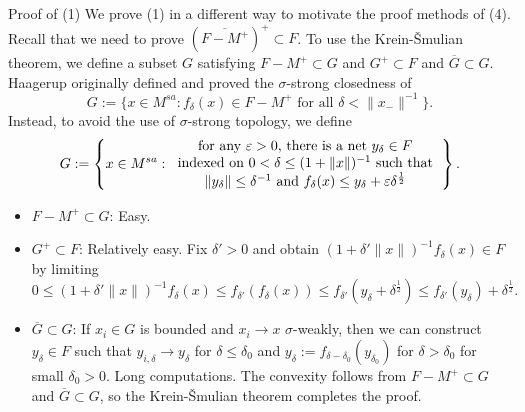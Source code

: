 \documentclass{../../../slide}
\begin{document}
\begin{frame}{Proof of (1)}
We prove (1) in a different way to motivate the proof methods of (4).
Recall that we need to prove $(\overline{F-M^+})^+\subset F$.
To use the Krein-\v Smulian theorem, we define a subset $G$ satisfying $F-M^+\subset G$ and $G^+\subset F$ and $\overline G\subset G$.
\pause
Haagerup originally defined and proved the $\sigma$-strong closedness of
\[G:=\{x\in M^{sa}:f_\delta(x)\in F-M^+\text{ for all }\delta<\|x_-\|^{-1}\}.\]
\pause
Instead, to avoid the use of $\sigma$-strong topology, we define
\[G:=\left\{x\in M^{sa}:\begin{tabular}{c}
for any $\varepsilon>0$, there is a net $y_\delta\in F$\\
indexed on $0<\delta\le(1+\|x\|)^{-1}$ such that\\
$\|y_\delta\|\le\delta^{-1}$ and $f_\delta(x)\le y_\delta+\varepsilon\delta^{\frac12}$
\end{tabular}\right\}.\]
\pause
\begin{itemize}
\item $F-M^+\subset G$: Easy.
\item $G^+\subset F$: Relatively easy. Fix $\delta'>0$ and obtain $(1+\delta'\|x\|)^{-1}f_\delta(x)\in F$ by limiting
\[0\le(1+\delta'\|x\|)^{-1}f_\delta(x)\le f_{\delta'}(f_\delta(x))\le f_{\delta'}(y_\delta+\delta^{\frac12})\le f_{\delta'}(y_\delta)+\delta^{\frac12}.\]
\item $\overline G\subset G$: If $x_i\in G$ is bounded and $x_i\to x$ $\sigma$-weakly, then we can construct $y_\delta\in F$ such that $y_{i,\delta}\to y_\delta$ for $\delta\le\delta_0$ and $y_\delta:=f_{\delta-\delta_0}(y_{\delta_0})$ for $\delta>\delta_0$ for small $\delta_0>0$.
Long computations.
The convexity follows from $F-M^+\subset G$ and $\overline G\subset G$, so the Krein-\v Smulian theorem completes the proof.
\end{itemize}
\end{frame}
\end{document}
